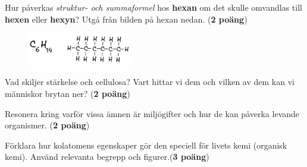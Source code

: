 \documentclass[12pt]{exam}
\begin{document}
\begin{questions}
\question Hur påverkas \textit{struktur- och summaformel} hos \textbf{hexan} om det skulle omvandlas till \textbf{hexen} eller \textbf{hexyn}? Utgå från bilden på hexan nedan. (\textbf{2 poäng})

\begin{figure}[h]
  \centering
  \includegraphics[width=0.4\textwidth]{hexan.png}
\end{figure}
\vspace{5mm}

\break

\question Vad skiljer stärkelse och cellulosa? Vart hittar vi dem och vilken av dem kan vi människor brytan ner? (\textbf{2 poäng})
\vspace{50mm}

\question Resonera kring varför vissa ämnen är miljögifter och hur de kan påverka levande organismer. (\textbf{2 poäng})
\vspace{50mm}

\question Förklara hur kolatomens egenskaper gör den speciell för livets kemi (organisk kemi). Använd relevanta begrepp och figurer.(\textbf{3 poäng})
\vspace{50mm}

\end{questions}
\end{document}
